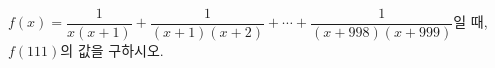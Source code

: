 $f(x)=\dfrac{1}{x(x+1)}+\dfrac{1}{(x+1)(x+2)}+\cdots+\dfrac{1}{(x+998)(x+999)}$일 때, $f(111)$의 값을 구하시오.
